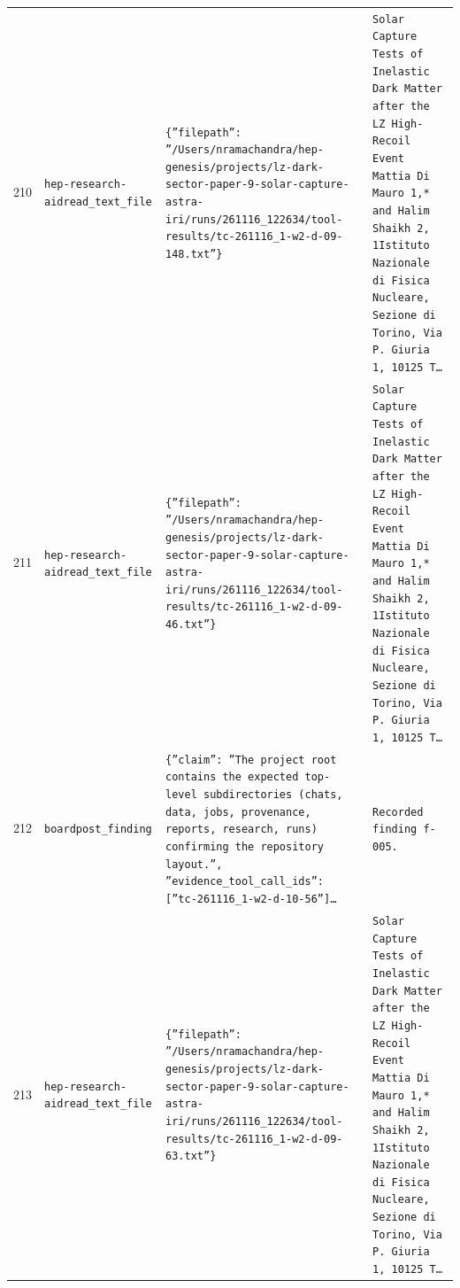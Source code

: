 \documentclass[11pt,a4paper]{article}
\begin{document}
\begin{longtable}{@{}p{}p{}p{}p{}@{}}
210 & \texttt{hep-research-aid}\newline\texttt{read\_\allowbreak{}text\_\allowbreak{}file} & \texttt{\{''filepath'':\allowbreak{} ''/\allowbreak{}Users/\allowbreak{}nramachandra/\allowbreak{}hep-genesis/\allowbreak{}projects/\allowbreak{}lz-dark-sector-paper-9-solar-capture-astra-iri/\allowbreak{}runs/\allowbreak{}261116\_\allowbreak{}122634/\allowbreak{}tool-results/\allowbreak{}tc-261116\_\allowbreak{}1-w2-d-09-148.txt''\}\allowbreak{}} & \texttt{Solar Capture Tests of Inelastic Dark Matter after the LZ High-Recoil Event Mattia Di Mauro 1,\allowbreak{}* and Halim Shaikh 2,\allowbreak{}\dag{}\allowbreak{} 1Istituto Nazionale di Fisica Nucleare,\allowbreak{} Sezione di Torino,\allowbreak{} Via P. Giuria 1,\allowbreak{} 10125 T\ldots{}\allowbreak{}} \\
211 & \texttt{hep-research-aid}\newline\texttt{read\_\allowbreak{}text\_\allowbreak{}file} & \texttt{\{''filepath'':\allowbreak{} ''/\allowbreak{}Users/\allowbreak{}nramachandra/\allowbreak{}hep-genesis/\allowbreak{}projects/\allowbreak{}lz-dark-sector-paper-9-solar-capture-astra-iri/\allowbreak{}runs/\allowbreak{}261116\_\allowbreak{}122634/\allowbreak{}tool-results/\allowbreak{}tc-261116\_\allowbreak{}1-w2-d-09-46.txt''\}\allowbreak{}} & \texttt{Solar Capture Tests of Inelastic Dark Matter after the LZ High-Recoil Event Mattia Di Mauro 1,\allowbreak{}* and Halim Shaikh 2,\allowbreak{}\dag{}\allowbreak{} 1Istituto Nazionale di Fisica Nucleare,\allowbreak{} Sezione di Torino,\allowbreak{} Via P. Giuria 1,\allowbreak{} 10125 T\ldots{}\allowbreak{}} \\
212 & \texttt{board}\newline\texttt{post\_\allowbreak{}finding} & \texttt{\{''claim'':\allowbreak{} ''The project root contains the expected top-level subdirectories (chats,\allowbreak{} data,\allowbreak{} jobs,\allowbreak{} provenance,\allowbreak{} reports,\allowbreak{} research,\allowbreak{} runs)\allowbreak{} confirming the repository layout.'',\allowbreak{} ''evidence\_\allowbreak{}tool\_\allowbreak{}call\_\allowbreak{}ids'':\allowbreak{} [''tc-261116\_\allowbreak{}1-w2-d-10-56'']\allowbreak{}\ldots{}\allowbreak{}} & \texttt{Recorded finding f-005.} \\
213 & \texttt{hep-research-aid}\newline\texttt{read\_\allowbreak{}text\_\allowbreak{}file} & \texttt{\{''filepath'':\allowbreak{} ''/\allowbreak{}Users/\allowbreak{}nramachandra/\allowbreak{}hep-genesis/\allowbreak{}projects/\allowbreak{}lz-dark-sector-paper-9-solar-capture-astra-iri/\allowbreak{}runs/\allowbreak{}261116\_\allowbreak{}122634/\allowbreak{}tool-results/\allowbreak{}tc-261116\_\allowbreak{}1-w2-d-09-63.txt''\}\allowbreak{}} & \texttt{Solar Capture Tests of Inelastic Dark Matter after the LZ High-Recoil Event Mattia Di Mauro 1,\allowbreak{}* and Halim Shaikh 2,\allowbreak{}\dag{}\allowbreak{} 1Istituto Nazionale di Fisica Nucleare,\allowbreak{} Sezione di Torino,\allowbreak{} Via P. Giuria 1,\allowbreak{} 10125 T\ldots{}\allowbreak{}} \\

\end{longtable}
\end{document}
